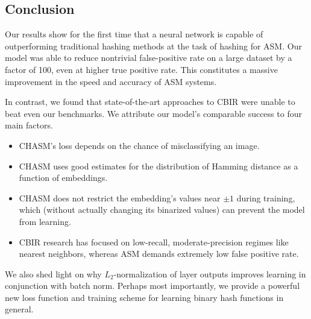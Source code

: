 \documentclass{article}
\begin{document}
\begin{multicols}{2}
\section{Conclusion}

Our results show for the first time that a neural network is capable of outperforming traditional hashing methods at the task of hashing for ASM.
Our model was able to reduce nontrivial false-positive rate on a large dataset by a factor of 100, even at higher true positive rate.
This constitutes a massive improvement in the speed and accuracy of ASM systems.

In contrast, we found that state-of-the-art approaches to CBIR were unable to beat even our benchmarks.
We attribute our model's comparable success to four main factors.
\begin{itemize}
\item CHASM's loss depends on the chance of misclassifying an image.
\item CHASM uses good estimates for the distribution of Hamming distance as a function of embeddings.
\item CHASM does not restrict the embedding's values near $\pm1$ during training, which (without actually changing its binarized values) can prevent the model from learning.
\item CBIR research has focused on low-recall, moderate-precision regimes like nearest neighbors, whereas ASM demands extremely low false positive rate.
\end{itemize}

We also shed light on why $L_2$-normalization of layer outputs improves learning in conjunction with batch norm.
Perhaps most importantly, we provide a powerful new loss function and training scheme for learning binary hash functions in general.



\end{multicols}
\end{document}
